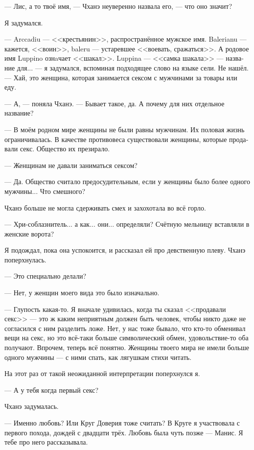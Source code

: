 \documentclass[a4paper,12pt,fleqn]{book}\usepackage{cooltooltips}\usepackage{polyglossia}\setdefaultlanguage[babelshorthands=true]{russian}\setotherlanguage{english}\defaultfontfeatures{Ligatures=TeX,Mapping=tex-text} \usepackage{xcolor}\definecolor{lightgray}{HTML}{bbbbbb}\color{lightgray}\newcommand{\ml}[3]{\textenglish{\textcolor{black}{#3}}}
\begin{document}
{--- Лис, а то твоё имя, --- Чханэ неуверенно назвала его, --- что оно значит?

Я задумался.

--- Arccadiu --- <<крестьянин>>, распространённое мужское имя.
Balerianu --- кажется, <<воин>>, baleru --- устаревшее <<воевать, сражаться>>.
А родовое имя Luppino ознaчает <<шакал>>.
Luppina --- <<самка шакала>> --- название для... --- я задумался, вспоминая подходящее слово на языке сели.
Не нашёл.
--- Хай, это женщина, которая занимается сексом с мужчинами за товары или еду.

--- А, --- поняла Чханэ.
--- Бывает такое, да.
А почему для них отдельное название?

--- В моём родном мире женщины не были равны мужчинам.
Их половая жизнь ограничивалась.
В качестве противовеса существовали женщины, которые продавали секс.
Общество их презирало.

--- Женщинам не давали заниматься сексом?

--- Да.
Общество считало предосудительным, если у женщины было более одного мужчины...
Что смешного?

Чханэ больше не могла сдерживать смех и захохотала во всё горло.

--- Хри-соблазнитель... а как... они... определяли?
Счётную мельницу вставляли в женские ворота?

Я подождал, пока она успокоится, и рассказал ей про девственную плеву.
Чханэ поперхнулась.

--- Это специально делали?

--- Нет, у женщин моего вида это было изначально.

--- Глупость какая-то.
Я вначале удивилась, когда ты сказал <<продавали секс>> --- это ж каким неприятным должен быть человек, чтобы никто даже не согласился с ним разделить ложе.
Нет, у нас тоже бывало, что кто-то обменивал вещи на секс, но это всё-таки больше символический обмен, удовольствие-то оба получают.
Впрочем, теперь всё понятно.
Женщины твоего мира не имели больше одного мужчины --- с ними спать, как лягушкам стихи читать.

На этот раз от такой неожиданной интерпретации поперхнулся я.

--- А у тебя когда первый секс?

Чханэ задумалась.

--- Именно любовь?
Или Круг Доверия тоже считать?
В Круге я участвовала с первого похода, дождей с двадцати трёх.
Любовь была чуть позже --- Манис.
Я тебе про него рассказывала.

}
\end{document}
